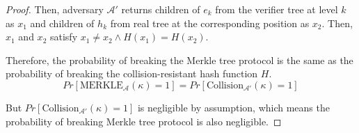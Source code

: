 \begin{proof}
Then, adversary $\mathcal{A}'$ returns children of $e_k$ from the verifier tree at level $k$ as $x_1$ and children of $h_k$ from real tree at the corresponding position as $x_2$. Then, $x_1$ and $x_2$ satisfy $x_1 \neq x_2 \land H(x_1) = H(x_2)$.

Therefore, the probability of breaking the Merkle tree protocol is the same as the probability of breaking the collision-resistant hash function $H$.
$$
Pr[\mathrm{MERKLE}_{\mathcal{A}}(\kappa) = 1] = Pr[\mathrm{Collision}_{\mathcal{A}'}(\kappa) = 1]
$$

But $Pr[\mathrm{Collision}_{\mathcal{A}'}(\kappa) = 1]$ is negligible by assumption, which means the probability of breaking Merkle tree protocol is also negligible.

\end{proof}
